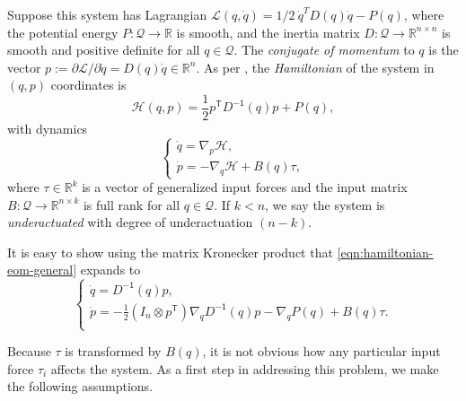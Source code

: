 \documentclass[journal,twoside,web]{ieeecolor}
\newcommand*{\tpose}{^\mathsf{T}}
\newcommand*{\inv}{^\mathsf{-1}}
\newcommand*{\R}{\mathbb{R}}
\newcommand*{\Id}[1]{I_{#1}}
\begin{document}
Suppose this system has Lagrangian
\(\mathcal{L}(q,\dot{q}) = 1/2~\dot{q}^T D(q) \dot{q} - P(q)\),
where the potential energy 
\(P : \mathcal{Q} \rightarrow \mathbb{R}\) 
is smooth, and the inertia matrix 
\(D : \mathcal{Q} \rightarrow \mathbb{R}^{n \times n}\)
is smooth and positive definite for all \(q \in \mathcal{Q}\).
The \textit{conjugate of momentum} to \(q\) is the vector
\(p := \partial\mathcal{L}/\partial\dot{q} = D(q) \dot{q} \in \R^n\).
As per \cite{landau_mechanics}, 
the \textit{Hamiltonian} of the system in \((q,p)\) coordinates
is
\begin{equation}\label{eqn:hamiltonian}
    \mathcal{H}(q,p) = \frac{1}{2} p\tpose D\inv(q) p + P(q)
    ,
\end{equation}
with dynamics
\begin{equation}\label{eqn:hamiltonian-eom-general}
    \begin{cases}
        \dot{q} = \nabla_p\mathcal{H} 
        , \\
        \dot{p} = -\nabla_q\mathcal{H} + B(q) \tau
        ,
    \end{cases}
\end{equation}
where \(\tau \in \R^k\) is a vector of generalized input forces and the input
matrix \(B : \mathcal{Q} \rightarrow \R^{n \times k}\) is full rank for all 
\(q \in \mathcal{Q}\).
If \(k < n\), we say the system is \textit{underactuated} with degree of
underactuation \((n-k)\).

It is easy to show using the matrix Kronecker product that
\eqref{eqn:hamiltonian-eom-general} expands to
\begin{equation*}\label{eqn:hamiltonian-full-dynamics}
     \begin{cases}
        \dot{q} = D\inv(q)p 
        , \\
        \dot{p} = -\frac{1}{2} (\Id{n} \otimes p\tpose) \nabla_q D\inv(q) p
        - \nabla_q P(q) + B(q) \tau
        . \\
    \end{cases}
\end{equation*}

Because \(\tau\) is transformed by \(B(q)\), it is not obvious how any
particular input force \(\tau_i\) affects the system.
As a first step in addressing this problem, we make the following assumptions.
\end{document}
